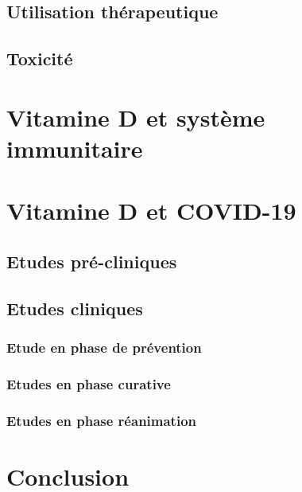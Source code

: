\documentclass[
  letterpaper,
  DIV=11,
  numbers=noendperiod]{scrartcl}
\begin{document}
\hypertarget{utilisation-thuxe9rapeutique}{%
\subsection{Utilisation
thérapeutique}\label{utilisation-thuxe9rapeutique}}

\hypertarget{toxicituxe9}{%
\subsection{Toxicité}\label{toxicituxe9}}

\textcite{Marcinowska-Suchowierska.2018}

\hypertarget{vitamine-d-et-systuxe8me-immunitaire}{%
\section{Vitamine D et système
immunitaire}\label{vitamine-d-et-systuxe8me-immunitaire}}

\textcite{Dankers.2017}

\hypertarget{vitamine-d-et-covid-19}{%
\section{Vitamine D et COVID-19}\label{vitamine-d-et-covid-19}}

\hypertarget{etudes-pruxe9-cliniques}{%
\subsection{Etudes pré-cliniques}\label{etudes-pruxe9-cliniques}}

\hypertarget{etudes-cliniques}{%
\subsection{Etudes cliniques}\label{etudes-cliniques}}

\hypertarget{etude-en-phase-de-pruxe9vention}{%
\subsubsection{Etude en phase de
prévention}\label{etude-en-phase-de-pruxe9vention}}

\hypertarget{etudes-en-phase-curative}{%
\subsubsection{Etudes en phase
curative}\label{etudes-en-phase-curative}}

\hypertarget{etudes-en-phase-ruxe9animation}{%
\subsubsection{Etudes en phase
réanimation}\label{etudes-en-phase-ruxe9animation}}

\newpage{}

\hypertarget{conclusion}{%
\section{Conclusion}\label{conclusion}}

\newpage{}


\printbibliography[title=References]
\end{document}
